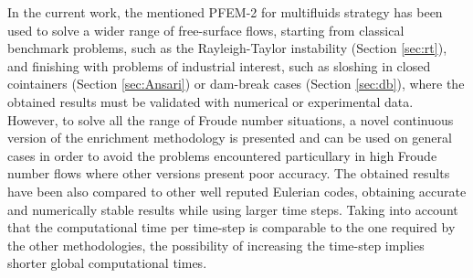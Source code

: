 In the current work, the mentioned PFEM-2 for multifluids strategy has been used to solve a wider range of free-surface flows, starting from classical benchmark problems, such as the Rayleigh-Taylor instability (Section \ref{sec:rt}), and finishing with problems of industrial interest, such as sloshing in closed cointainers (Section \ref{sec:Ansari}) or dam-break cases (Section \ref{sec:db}), where the obtained results must be validated with numerical or experimental data. However, to solve all the range of Froude number situations, a novel continuous version of the enrichment methodology is presented and can be used on general cases in order to avoid the problems encountered particullary in high Froude number flows where other versions present poor accuracy. The obtained results have been also compared to other well reputed Eulerian codes, obtaining accurate and numerically stable results while using larger time steps. Taking into account that the computational time per time-step is comparable to the one required by the other methodologies, the possibility of increasing the time-step implies shorter global computational times.
